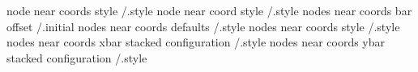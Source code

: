 node near coords style                       /.style
node near coord style                        /.style
nodes near coords bar offset                 /.initial
nodes near coords defaults                   /.style
nodes near coords style                      /.style
nodes near coords xbar stacked configuration /.style
nodes near coords ybar stacked configuration /.style

